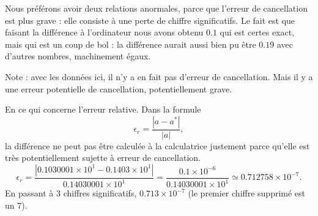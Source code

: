 \begin{example}
Nous préférons avoir deux relations anormales, parce que l'erreur de cancellation est plus grave : elle consiste à une perte de chiffre significatifs. Le fait est que faisant la différence à l'ordinateur nous avons obtenu \( 0.1\) qui est certes exact, mais qui est un coup de bol : la différence aurait aussi bien pu être \(0.19\) avec d'autres nombres, machinement égaux.

Note : avec les données ici, il n'y a en fait pas d'erreur de cancellation. Mais il y a une erreur potentielle de cancellation, potentiellement grave.

En ce qui concerne l'erreur relative. Dans la formule
\begin{equation}
    \epsilon_r=\frac{ | a-a^* | }{ | a | },
\end{equation}
la différence ne peut pas être calculée à la calculatrice justement parce qu'elle est très potentiellement sujette à erreur de cancellation.
\begin{equation}
    \epsilon_r=\frac{ | 0.1030001\times 10^1-0.1403\times 10^1 | }{ 0.14030001\times 10^1 }=\frac{ 0.1\times 10^{-6} }{ 0.14030001\times 10^1 }\simeq 0.712758\times 10^{-7}.
\end{equation}
En passant à \( 3\) chiffres significatifs, \( 0.713\times 10^{-7}\) (le premier chiffre supprimé est un \( 7\)).

\end{example}

